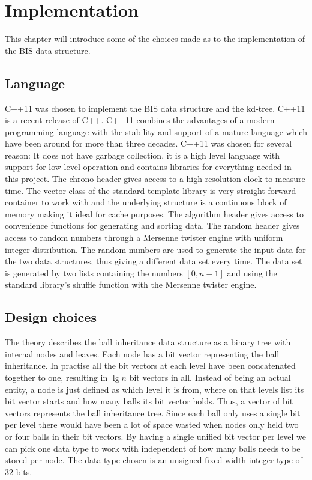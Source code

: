 \chapter{Implementation}
\label{ch:implementation}

This chapter will introduce some of the choices made as to the implementation of the BIS data structure.

\section{Language}

C++11 was chosen to implement the BIS data structure and the kd-tree. C++11 is a recent release of C++. C++11 combines the advantages of a modern programming language with the stability and support of a mature language which have been around for more than three decades. C++11 was chosen for several reason: It does not have garbage collection, it is a high level language with support for low level operation and contains libraries for everything needed in this project. The chrono header gives access to a high resolution clock to measure time. The vector class of the standard template library is very straight-forward container to work with and the underlying structure is a continuous block of memory making it ideal for cache purposes. The algorithm header gives access to convenience functions for generating and sorting data. The random header gives access to random numbers through a Mersenne twister engine with uniform integer distribution. The random numbers are used to generate the input data for the two data structures, thus giving a different data set every time. The data set is generated by two lists containing the numbers $[0,n-1]$ and using the standard library's shuffle function with the Mersenne twister engine. 

\section{Design choices}

The theory describes the ball inheritance data structure as a binary tree with internal nodes and leaves. Each node has a bit vector representing the ball inheritance. In practise all the bit vectors at each level have been concatenated together to one, resulting in $\lg n$ bit vectors in all. Instead of being an actual entity, a node is just defined as which level it is from, where on that levels list its bit vector starts and how many balls its bit vector holds. Thus, a vector of bit vectors represents the ball inheritance tree. Since each ball only uses a single bit per level there would have been a lot of space wasted when nodes only held two or four balls in their bit vectors. By having a single unified bit vector per level we can pick one data type to work with independent of how many balls needs to be stored per node. The data type chosen is an unsigned fixed width integer type of $32$ bits. \\

